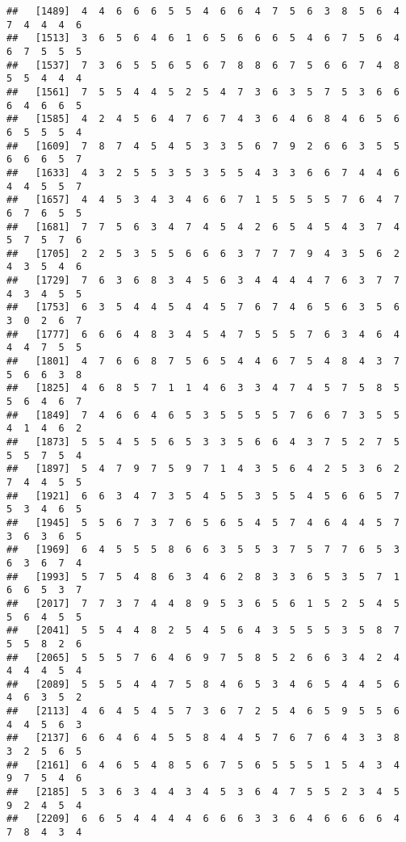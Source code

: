 \documentclass[
]{book}
\begin{document}
\begin{verbatim}
##   [1489]  4  4  6  6  6  5  5  4  6  6  4  7  5  6  3  8  5  6  4  7  4  4  4  6
##   [1513]  3  6  5  6  4  6  1  6  5  6  6  6  5  4  6  7  5  6  4  6  7  5  5  5
##   [1537]  7  3  6  5  5  6  5  6  7  8  8  6  7  5  6  6  7  4  8  5  5  4  4  4
##   [1561]  7  5  5  4  4  5  2  5  4  7  3  6  3  5  7  5  3  6  6  6  4  6  6  5
##   [1585]  4  2  4  5  6  4  7  6  7  4  3  6  4  6  8  4  6  5  6  6  5  5  5  4
##   [1609]  7  8  7  4  5  4  5  3  3  5  6  7  9  2  6  6  3  5  5  6  6  6  5  7
##   [1633]  4  3  2  5  5  3  5  3  5  5  4  3  3  6  6  7  4  4  6  4  4  5  5  7
##   [1657]  4  4  5  3  4  3  4  6  6  7  1  5  5  5  5  7  6  4  7  6  7  6  5  5
##   [1681]  7  7  5  6  3  4  7  4  5  4  2  6  5  4  5  4  3  7  4  5  7  5  7  6
##   [1705]  2  2  5  3  5  5  6  6  6  3  7  7  7  9  4  3  5  6  2  4  3  5  4  6
##   [1729]  7  6  3  6  8  3  4  5  6  3  4  4  4  4  7  6  3  7  7  4  3  4  5  5
##   [1753]  6  3  5  4  4  5  4  4  5  7  6  7  4  6  5  6  3  5  6  3  0  2  6  7
##   [1777]  6  6  6  4  8  3  4  5  4  7  5  5  5  7  6  3  4  6  4  4  4  7  5  5
##   [1801]  4  7  6  6  8  7  5  6  5  4  4  6  7  5  4  8  4  3  7  5  6  6  3  8
##   [1825]  4  6  8  5  7  1  1  4  6  3  3  4  7  4  5  7  5  8  5  5  6  4  6  7
##   [1849]  7  4  6  6  4  6  5  3  5  5  5  5  7  6  6  7  3  5  5  4  1  4  6  2
##   [1873]  5  5  4  5  5  6  5  3  3  5  6  6  4  3  7  5  2  7  5  5  5  7  5  4
##   [1897]  5  4  7  9  7  5  9  7  1  4  3  5  6  4  2  5  3  6  2  7  4  4  5  5
##   [1921]  6  6  3  4  7  3  5  4  5  5  3  5  5  4  5  6  6  5  7  5  3  4  6  5
##   [1945]  5  5  6  7  3  7  6  5  6  5  4  5  7  4  6  4  4  5  7  3  6  3  6  5
##   [1969]  6  4  5  5  5  8  6  6  3  5  5  3  7  5  7  7  6  5  3  6  3  6  7  4
##   [1993]  5  7  5  4  8  6  3  4  6  2  8  3  3  6  5  3  5  7  1  6  6  5  3  7
##   [2017]  7  7  3  7  4  4  8  9  5  3  6  5  6  1  5  2  5  4  5  5  6  4  5  5
##   [2041]  5  5  4  4  8  2  5  4  5  6  4  3  5  5  5  3  5  8  7  5  5  8  2  6
##   [2065]  5  5  5  7  6  4  6  9  7  5  8  5  2  6  6  3  4  2  4  4  4  4  5  4
##   [2089]  5  5  5  4  4  7  5  8  4  6  5  3  4  6  5  4  4  5  6  4  6  3  5  2
##   [2113]  4  6  4  5  4  5  7  3  6  7  2  5  4  6  5  9  5  5  6  4  4  5  6  3
##   [2137]  6  6  4  6  4  5  5  8  4  4  5  7  6  7  6  4  3  3  8  3  2  5  6  5
##   [2161]  6  4  6  5  4  8  5  6  7  5  6  5  5  5  1  5  4  3  4  9  7  5  4  6
##   [2185]  5  3  6  3  4  4  3  4  5  3  6  4  7  5  5  2  3  4  5  9  2  4  5  4
##   [2209]  6  6  5  4  4  4  4  6  6  6  3  3  6  4  6  6  6  6  4  7  8  4  3  4

\end{verbatim}
\end{document}
